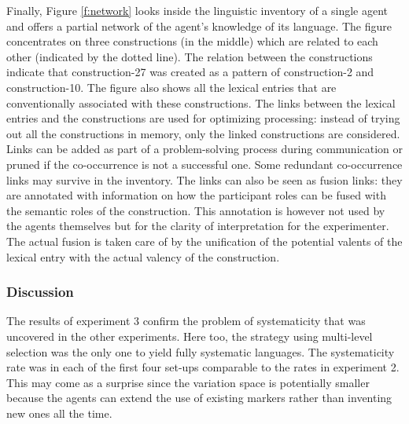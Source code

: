Finally, Figure \ref{f:network} looks inside the linguistic inventory of a single agent and offers a partial network of the agent's knowledge of its language. The figure concentrates on three constructions (in the middle) which are related to each other (indicated by the dotted line). The relation between the constructions indicate that construction-27 was created as a pattern of construction-2 and construction-10. The figure also shows all the lexical entries that are conventionally associated with these constructions. The links between the lexical entries and the constructions are used for optimizing processing: instead of trying out all the constructions in memory, only the linked constructions are considered. Links can be added as part of a problem-solving process during communication or pruned if the co-occurrence is not a successful one. Some redundant co-occurrence links may survive in the inventory. The links can also be seen as fusion links: they are annotated with information on how the participant roles can be fused with the semantic roles of the construction. This annotation is however not used by the agents themselves but for the clarity of interpretation for the experimenter. The actual fusion is taken care of by the unification of the potential valents of the lexical entry with the actual valency of the construction.


\subsubsection{Discussion}
 The results of experiment 3 confirm the problem of systematicity that was uncovered in the other experiments. Here too, the strategy using multi-level selection was the only one to yield fully systematic languages. The systematicity rate was in each of the first four set-ups comparable to the rates in experiment 2. This may come as a surprise since the variation space is potentially smaller because the agents can extend the use of existing markers rather than inventing new ones all the time.

